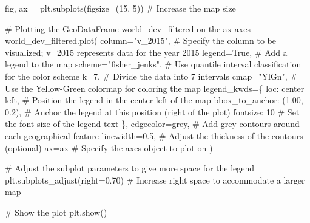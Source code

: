 \documentclass[
  letterpaper,
  DIV=11,
  numbers=noendperiod]{scrreprt}
\newenvironment{Shaded}{\begin{snugshade}}{\end{snugshade}}
\newcommand{\CommentTok}[1]{\textcolor[rgb]{0.37,0.37,0.37}{#1}}
\newcommand{\DecValTok}[1]{\textcolor[rgb]{0.68,0.00,0.00}{#1}}
\newcommand{\FloatTok}[1]{\textcolor[rgb]{0.68,0.00,0.00}{#1}}
\newcommand{\NormalTok}[1]{\textcolor[rgb]{0.00,0.23,0.31}{#1}}
\newcommand{\OperatorTok}[1]{\textcolor[rgb]{0.37,0.37,0.37}{#1}}
\newcommand{\StringTok}[1]{\textcolor[rgb]{0.13,0.47,0.30}{#1}}
\newcommand{\VariableTok}[1]{\textcolor[rgb]{0.07,0.07,0.07}{#1}}
\begin{document}
\begin{Shaded}
\begin{Highlighting}[]
\NormalTok{fig, ax }\OperatorTok{=}\NormalTok{ plt.subplots(figsize}\OperatorTok{=}\NormalTok{(}\DecValTok{15}\NormalTok{, }\DecValTok{5}\NormalTok{))  }\CommentTok{\# Increase the map size}

\CommentTok{\# Plotting the GeoDataFrame \textasciigrave{}world\_dev\_filtered\textasciigrave{} on the \textasciigrave{}ax\textasciigrave{} axes}
\NormalTok{world\_dev\_filtered.plot(}
\NormalTok{    column}\OperatorTok{=}\StringTok{"v\_2015"}\NormalTok{,  }\CommentTok{\# Specify the column to be visualized; \textasciigrave{}v\_2015\textasciigrave{} represents data for the year 2015}
\NormalTok{    legend}\OperatorTok{=}\VariableTok{True}\NormalTok{,  }\CommentTok{\# Add a legend to the map}
\NormalTok{    scheme}\OperatorTok{=}\StringTok{"fisher\_jenks"}\NormalTok{,  }\CommentTok{\# Use quantile interval classification for the color scheme}
\NormalTok{    k}\OperatorTok{=}\DecValTok{7}\NormalTok{,  }\CommentTok{\# Divide the data into 7 intervals}
\NormalTok{    cmap}\OperatorTok{=}\StringTok{"YlGn"}\NormalTok{,  }\CommentTok{\# Use the Yellow{-}Green colormap for coloring the map}
\NormalTok{    legend\_kwds}\OperatorTok{=}\NormalTok{\{}
        \StringTok{\textquotesingle{}loc\textquotesingle{}}\NormalTok{: }\StringTok{\textquotesingle{}center left\textquotesingle{}}\NormalTok{,  }\CommentTok{\# Position the legend in the center left of the map}
        \StringTok{\textquotesingle{}bbox\_to\_anchor\textquotesingle{}}\NormalTok{: (}\FloatTok{1.00}\NormalTok{, }\FloatTok{0.2}\NormalTok{),  }\CommentTok{\# Anchor the legend at this position (right of the plot)}
        \StringTok{\textquotesingle{}fontsize\textquotesingle{}}\NormalTok{: }\DecValTok{10}  \CommentTok{\# Set the font size of the legend text}
\NormalTok{    \},}
\NormalTok{    edgecolor}\OperatorTok{=}\StringTok{\textquotesingle{}grey\textquotesingle{}}\NormalTok{,  }\CommentTok{\# Add grey contours around each geographical feature}
\NormalTok{    linewidth}\OperatorTok{=}\FloatTok{0.5}\NormalTok{,  }\CommentTok{\# Adjust the thickness of the contours (optional)}
\NormalTok{    ax}\OperatorTok{=}\NormalTok{ax  }\CommentTok{\# Specify the axes object to plot on}
\NormalTok{)}

\CommentTok{\# Adjust the subplot parameters to give more space for the legend}
\NormalTok{plt.subplots\_adjust(right}\OperatorTok{=}\FloatTok{0.70}\NormalTok{)  }\CommentTok{\# Increase right space to accommodate a larger map}

\CommentTok{\# Show the plot}
\NormalTok{plt.show()}
\end{Highlighting}
\end{Shaded}
\end{document}
